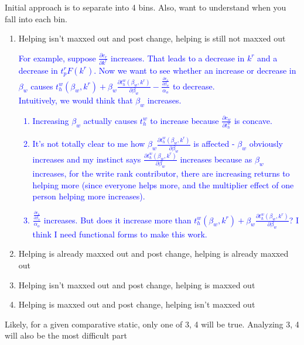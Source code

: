 \documentclass[12pt,notitlepage]{article}
\begin{document}
    Initial approach is to separate into 4 bins. Also, want to understand when you fall into each bin. 
\begin{enumerate}
    \item Helping isn't maxxed out and post change, helping is still not maxxed out\\
    \textcolor{blue}{For example, suppose $\frac{\partial c_r}{\partial k^r}$ increases. That leads to a decrease in $k^r$ and a decrease in $t_p^r F(k^r)$. Now we want to see whether an increase or decrease in $\beta_w$ causes $ t_h^w(\beta_w, k^r) + \beta_w\frac{\partial t_h^w(\beta_w, k^r)}{\partial \beta_w} -\frac{\frac{\partial c_o}{\partial \beta_w}}{\alpha_o}$ to decrease. \\
    Intuitively, we would think that $\beta_w$ increases. \begin{enumerate}
        \item Increasing $\beta_w$ actually causes $t_h^w$ to increase because $\frac{\partial c_w}{\partial t_h^w}$ is concave. 
        \item It's not totally clear to me how $\beta_w\frac{\partial t_h^w(\beta_w, k^r)}{\partial \beta_w}$ is affected - $\beta_w$ obviously increases and my instinct says $\frac{\partial t_h^w(\beta_w, k^r)}{\partial \beta_w}$ increases because as $\beta_w$ increases, for the write rank contributor, there are increasing returns to helping more (since everyone helps more, and the multiplier effect of one person helping more increases). 
        \item $\frac{\frac{\partial c_o}{\partial \beta_o}}{\alpha_o}$ increases. But does it increase more than $t_h^w(\beta_w, k^r) + \beta_w\frac{\partial t_h^w(\beta_w, k^r)}{\partial \beta_w}$? I think I need functional forms to make this work. 
    \end{enumerate}}
    \item Helping is already maxxed out and post change, helping is already maxxed out
    \item Helping isn't maxxed out and post change, helping is  maxxed out
    \item Helping is maxxed out and post change, helping isn't maxxed out
\end{enumerate}
Likely, for a given comparative static, only one of 3, 4 will be true. Analyzing 3, 4 will also be the most difficult part
\end{document}
